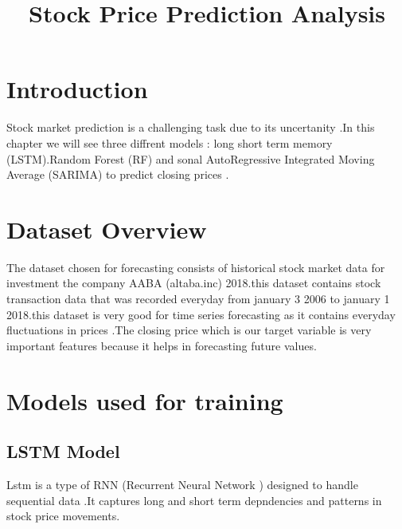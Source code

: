 \documentclass{article}
\title{Stock Price Prediction Analysis}
\author{}
\date{}
\begin{document}
\maketitle

\section{Introduction}
Stock market prediction is a challenging task due to its uncertanity .In this chapter we will see three diffrent models : long short term memory (LSTM).Random Forest (RF) and sonal AutoRegressive Integrated Moving Average (SARIMA) to predict closing prices .

\section{Dataset Overview}
The dataset chosen for forecasting consists of historical stock market data for investment the company AABA (altaba.inc) 2018.this dataset contains stock transaction data that was recorded everyday from january 3 2006 to january 1 2018.this dataset is very good for time series forecasting as it contains everyday fluctuations in prices .The closing price which is our target variable is very important features because it helps in forecasting future values.

\section{Models used for training}

\subsection{LSTM Model}
Lstm is a type of RNN (Recurrent Neural Network ) designed to handle sequential data .It captures long and short term depndencies and patterns in stock price movements.
\end{document}
